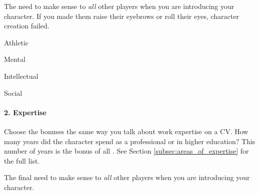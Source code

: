\begin{emphasisParagraph}
The  need to make sense to \emph{all} other players
when you are introducing your character.
If you made them raise their eyebrows or roll their eyes, character creation failed.
\end{emphasisParagraph}


\begin{capabilitiesTable}{Athletic}
\end{capabilitiesTable}
\begin{capabilitiesTable}{Mental}
\end{capabilitiesTable}
\begin{capabilitiesTable}{Intellectual}
\end{capabilitiesTable}
\begin{capabilitiesTable}{Social}
\end{capabilitiesTable}

\paragraph*{2. Expertise}

\begin{marginNote}
	
\end{marginNote}
Choose the bonuses the same way you talk about work expertise on a CV.
How many years did the character spend as a professional or in higher education?
This number of years is the bonus of all .
See Section \ref{subsec:areas_of_expertise} for the full list.

The final  need to make sense to \emph{all} other players
when you are introducing your character.\par





